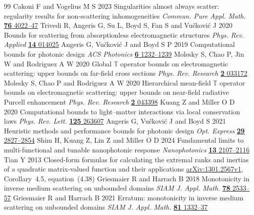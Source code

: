 \documentclass[anonymous,12pt]{iopjournal}
\theoremstyle{remark}\newtheorem{remark}[theorem]{Remark}
\numberwithin{equation}{section}
\begin{document}
\begin{thebibliography}{99}
Cakoni F and Vogelius M S 2023 Singularities almost always scatter: regularity results for non-scattering inhomogeneities \emph{Commun. Pure Appl. Math.} \href{https://doi.org/10.1002/cpa.22117}{\textbf{76} 4022--47}
 Trivedi R, Angeris G, Su L, Boyd S, Fan S and Vu\v{c}kovi\'{c} J 2020 Bounds for scattering from absorptionless electromagnetic structures \emph{Phys. Rev. Applied} \href{https://doi.org/10.1103/PhysRevApplied.14.014025}{\textbf{14} 014025}
 Angeris G, Vu\v{c}kovi\'{c} J and Boyd S P 2019 Computational bounds for photonic design \emph{ACS Photonics} \href{https://doi.org/10.1021/acsphotonics.9b00154}{\textbf{6} 1232--1239}
 Molesky S, Chao P, Jin W and Rodriguez A W 2020 Global $\mathbb{T}$ operator bounds on electromagnetic scattering: upper bounds on far-field cross sections \emph{Phys. Rev. Research} \href{https://doi.org/10.1103/PhysRevResearch.2.033172}{\textbf{2} 033172}
 Molesky S, Chao P and Rodriguez A W 2020 Hierarchical mean-field $\mathbb{T}$ operator bounds on electromagnetic scattering: upper bounds on near-field radiative Purcell enhancement \emph{Phys. Rev. Research} \href{https://doi.org/10.1103/PhysRevResearch.2.043398}{\textbf{2} 043398}
 Kuang Z and Miller O D 2020 Computational bounds to light--matter interactions via local conservation laws \emph{Phys. Rev. Lett.} \href{https://doi.org/10.1103/PhysRevLett.125.263607}{\textbf{125} 263607}
 Angeris G, Vu\v{c}kovi\'{c} J and Boyd S 2021 Heuristic methods and performance bounds for photonic design \emph{Opt. Express} \href{https://doi.org/10.1364/OE.415052}{\textbf{29} 2827--2854}
 Shim H, Kuang Z, Lin Z and Miller O D 2024 Fundamental limits to multi-functional and tunable nanophotonic response \emph{Nanophotonics} \href{https://doi.org/10.1515/nanoph-2023-0630}{\textbf{13} 2107--2116}
 Tian Y 2013 Closed-form formulas for calculating the extremal ranks and inertias of a quadratic matrix-valued function and their applications \href{https://arxiv.org/abs/1301.2567v1}{arXiv:1301.2567v1}, Corollary~4.5, equation~(4.38)
Griesmaier R and Harrach B 2018 Monotonicity in inverse medium scattering on unbounded domains \emph{SIAM J. Appl. Math.} \href{https://doi.org/10.1137/18M1171679}{\textbf{78} 2533--57}
Griesmaier R and Harrach B 2021 Erratum: monotonicity in inverse medium scattering on unbounded domains \emph{SIAM J. Appl. Math.} \href{https://doi.org/10.1137/21M1399221}{\textbf{81} 1332--37}

\end{thebibliography}
\end{document}
